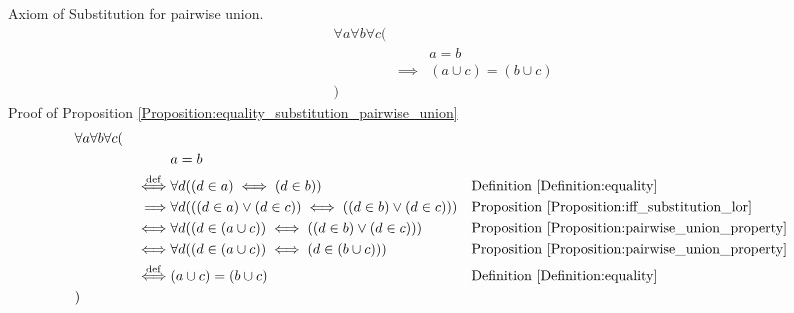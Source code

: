 \begin{prop}
\label{Proposition:equality_substitution_pairwise_union}
Axiom of Substitution for pairwise union.
\begin{align*}
& \forall a \forall b \forall c ( \\
& & & a = b \\
& & \implies & (a \cup c) = (b \cup c) \\
& )
\end{align*}
Proof of Proposition \ref{Proposition:equality_substitution_pairwise_union}
\begin{align*}
& \forall a \forall b \forall c ( \\
& & & a = b \\
& & \overset{\operatorname{def}}{\iff} & \forall d ((d \in a) \iff (d \in b))
& & \text{Definition \ref{Definition:equality}} \\
& & \implies & \forall d (((d \in a) \lor (d \in c)) \iff ((d \in b) \lor (d \in c)))
& & \text{Proposition \ref{Proposition:iff_substitution_lor}} \\
& & \iff & \forall d ((d \in (a \cup c)) \iff ((d \in b) \lor (d \in c)))
& & \text{Proposition \ref{Proposition:pairwise_union_property}} \\
& & \iff & \forall d ((d \in (a \cup c)) \iff (d \in (b \cup c)))
& & \text{Proposition \ref{Proposition:pairwise_union_property}} \\
& & \overset{\operatorname{def}}{\iff} & (a \cup c) = (b \cup c)
& & \text{Definition \ref{Definition:equality}} \\
& )
\end{align*}
\end{prop}

